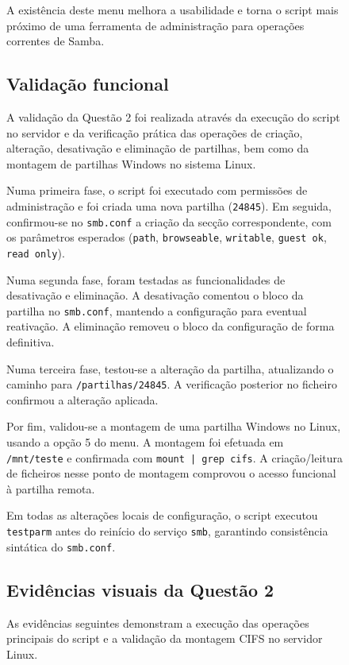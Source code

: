 \begin{figure}[H]
A exist\^encia deste menu melhora a usabilidade e torna o script mais pr\'oximo de uma ferramenta de administra\c{c}\~ao para opera\c{c}\~oes correntes de Samba.

\subsection{Valida\c{c}\~ao funcional}

A valida\c{c}\~ao da Quest\~ao 2 foi realizada atrav\'es da execu\c{c}\~ao do script no servidor e da verifica\c{c}\~ao pr\'atica das opera\c{c}\~oes de cria\c{c}\~ao, altera\c{c}\~ao, desativa\c{c}\~ao e elimina\c{c}\~ao de partilhas, bem como da montagem de partilhas Windows no sistema Linux.

Numa primeira fase, o script foi executado com permiss\~oes de administra\c{c}\~ao e foi criada uma nova partilha (\texttt{24845}). Em seguida, confirmou-se no \texttt{smb.conf} a cria\c{c}\~ao da sec\c{c}\~ao correspondente, com os par\^ametros esperados (\texttt{path}, \texttt{browseable}, \texttt{writable}, \texttt{guest ok}, \texttt{read only}).

Numa segunda fase, foram testadas as funcionalidades de desativa\c{c}\~ao e elimina\c{c}\~ao. A desativa\c{c}\~ao comentou o bloco da partilha no \texttt{smb.conf}, mantendo a configura\c{c}\~ao para eventual reativa\c{c}\~ao. A elimina\c{c}\~ao removeu o bloco da configura\c{c}\~ao de forma definitiva.

Numa terceira fase, testou-se a altera\c{c}\~ao da partilha, atualizando o caminho para \texttt{/partilhas/24845}. A verifica\c{c}\~ao posterior no ficheiro confirmou a altera\c{c}\~ao aplicada.

Por fim, validou-se a montagem de uma partilha Windows no Linux, usando a op\c{c}\~ao 5 do menu. A montagem foi efetuada em \texttt{/mnt/teste} e confirmada com \texttt{mount | grep cifs}. A cria\c{c}\~ao/leitura de ficheiros nesse ponto de montagem comprovou o acesso funcional \`a partilha remota.

Em todas as altera\c{c}\~oes locais de configura\c{c}\~ao, o script executou \texttt{testparm} antes do rein\'icio do servi\c{c}o \texttt{smb}, garantindo consist\^encia sint\'atica do \texttt{smb.conf}.

\subsection{Evid\^encias visuais da Quest\~ao 2}

As evid\^encias seguintes demonstram a execu\c{c}\~ao das opera\c{c}\~oes principais do script e a valida\c{c}\~ao da montagem CIFS no servidor Linux.


\end{figure}
